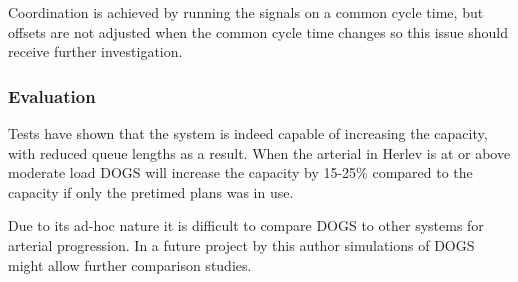 Coordination is achieved by running the signals on a common cycle time, but offsets are not adjusted when the common cycle time changes so this issue should receive further investigation.

\subsubsection*{Evaluation}
Tests have shown that the system is indeed capable of increasing the capacity, with reduced queue lengths as a result. When the arterial in Herlev is at or above moderate load DOGS will increase the capacity by 15-25\% compared to the capacity if only the pretimed plans was in use.

Due to its ad-hoc nature it is difficult to compare DOGS to other systems for arterial progression. In a future project by this author simulations of DOGS might allow further comparison studies.